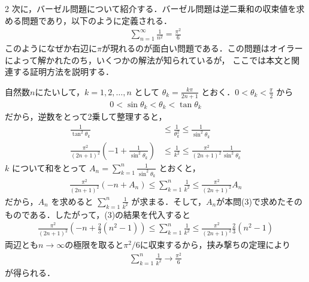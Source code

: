 \documentclass[../../main.tex]{subfiles}
\begin{document}
\begin{multicols}{2}
  次に，バーゼル問題について紹介する．バーゼル問題は逆二乗和の収束値を求める問題であり，以下のように定義される．
  \begin{align*}
    \sum_{n=1}^{\infty} \frac{1}{n^2} = \frac{\pi^2}{6}
  \end{align*}
  このようになぜか右辺に$\pi$が現れるのが面白い問題である．この問題はオイラーによって解かれたのち，いくつかの解法が知られているが，
  ここでは本文と関連する証明方法を説明する．

  自然数$n$にたいして，$k=1,2,\dots,n$ として $\theta_k = \frac{k\pi}{2n+1}$ とおく．$0 < \theta_k < \frac{\pi}{2}$ から
  \begin{align}
    0 < \sin\theta_k < \theta_k < \tan\theta_k
  \end{align}
  だから，逆数をとって2乗して整理すると，
  \begin{align*}
    \frac{1}{\tan^2\theta_k}                                          & \le \frac{1}{\theta_k^2} \le \frac{1}{\sin^2\theta_k}                 \\
    \frac{\pi^2}{(2n+1)^2} \left(-1 + \frac{1}{\sin^2\theta_k}\right) & \le \frac{1}{k^2} \le \frac{\pi^2}{(2n+1)^2} \frac{1}{\sin^2\theta_k}
  \end{align*}
  $k$ について和をとって $\displaystyle A_n = \sum_{k=1}^n \frac{1}{\sin^2\theta_k}$ とおくと，
  \begin{align}
    \frac{\pi^2}{(2n+1)^2} \left(-n + A_n\right) \le \sum_{k=1}^n \frac{1}{k^2} \le \frac{\pi^2}{(2n+1)^2} A_n
  \end{align}
  だから，$A_n$ を求めると $\displaystyle \sum_{k=1}^n \frac{1}{k^2}$ が求まる．そして，$A_n$が本問(3)で求めたそのものである．したがって，(3)の結果を代入すると
  \begin{align*}
    \frac{\pi^2}{(2n+1)^2} \left(-n + \frac{2}{3}(n^2-1)\right) \le \sum_{k=1}^n \frac{1}{k^2} \le \frac{\pi^2}{(2n+1)^2} \frac{2}{3}(n^2-1)
  \end{align*}
  両辺とも$n\to\infty$の極限を取ると$\pi^2/6$に収束するから，挟み撃ちの定理により
  \begin{align*}
    \sum_{k=1}^n \frac{1}{k^2} \longrightarrow \frac{\pi^2}{6}
  \end{align*}
  が得られる．

  \newpage
\end{multicols}
\end{document}
